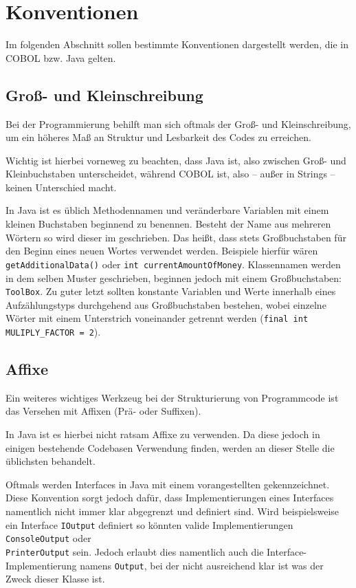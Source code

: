\section{Konventionen}
Im folgenden Abschnitt sollen bestimmte Konventionen dargestellt werden, die in COBOL bzw. Java gelten.

\subsection*{Groß- und Kleinschreibung}
Bei der Programmierung behilft man sich oftmals der Groß- und Kleinschreibung, um ein höheres Maß an Struktur und Lesbarkeit des Codes zu erreichen. 

Wichtig ist hierbei vorneweg zu beachten, dass Java  ist, also zwischen Groß- und Kleinbuchstaben unterscheidet, während COBOL  ist, also -- außer in Strings -- keinen Unterschied macht.

In Java ist es üblich Methodennamen und veränderbare Variablen mit einem kleinen Buchstaben beginnend zu benennen. Besteht der Name aus mehreren Wörtern so wird dieser im  geschrieben. Das heißt, dass stets Großbuchstaben für den Beginn eines neuen Wortes verwendet werden. Beispiele hierfür wären \texttt{getAdditionalData()} oder \texttt{int currentAmountOfMoney}. Klassennamen werden in dem selben Muster geschrieben, beginnen jedoch mit einem Großbuchstaben: \texttt{ToolBox}. Zu guter letzt sollten konstante Variablen und Werte innerhalb eines Aufzählungstyps durchgehend aus Großbuchstaben bestehen, wobei einzelne Wörter mit einem Unterstrich voneinander getrennt werden (\texttt{final int MULIPLY_FACTOR = 2}). 

\subsection*{Affixe}
Ein weiteres wichtiges Werkzeug bei der Strukturierung von Programmcode ist das Versehen mit Affixen (Prä- oder Suffixen).

In Java ist es hierbei nicht ratsam Affixe zu verwenden. Da diese jedoch in einigen bestehende Codebasen Verwendung finden, werden an dieser Stelle die üblichsten behandelt.

Oftmals werden Interfaces in Java mit einem vorangestellten  gekennzeichnet. Diese Konvention sorgt jedoch dafür, dass Implementierungen eines Interfaces namentlich nicht immer klar abgegrenzt und definiert sind. Wird beispielsweise ein Interface \texttt{IOutput} definiert so könnten valide Implementierungen \texttt{ConsoleOutput} oder \\\texttt{PrinterOutput} sein. Jedoch erlaubt dies namentlich auch die Interface-Implementierung namens \texttt{Output}, bei der nicht ausreichend klar ist was der Zweck dieser Klasse ist.


